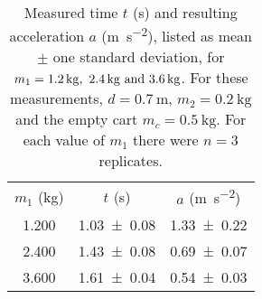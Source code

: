 \begin{table}[hb]
\caption{\label{tab:newtable1} Measured time $t$ (\unit{\second}) and resulting acceleration $a$ (\unit{\meter\per\second\squared}), listed as mean $\pm$ one standard deviation, for $m_1=\qtylist{1.2;2.4;3.6}{\kilo\gram}$. For these measurements, $d=\qty{0.7}{\meter}$, $m_2=\qty{0.2}{\kilo\gram}$ and the empty cart $m_c=\qty{0.5}{\kilo\gram}$. For each value of $m_1$ there were $n=3$ replicates. }
\begin{center}
\begin{ruledtabular}
\begin{tabular}{ccc}
$m_1$ (\unit{\kilo\gram}) & $t$ (\unit{\second}) & $a$ (\unit{\meter\per\second\squared}) \\ 
\colrule
\num{1.200} & \num{1.03\pm0.08} & \num{1.33\pm0.22} \\ 
\num{2.400} & \num{1.43\pm0.08} & \num{0.69\pm0.07} \\ 
\num{3.600} & \num{1.61\pm0.04} & \num{0.54\pm0.03} \\ 
\end{tabular}
\end{ruledtabular}
\end{center}
\end{table}
